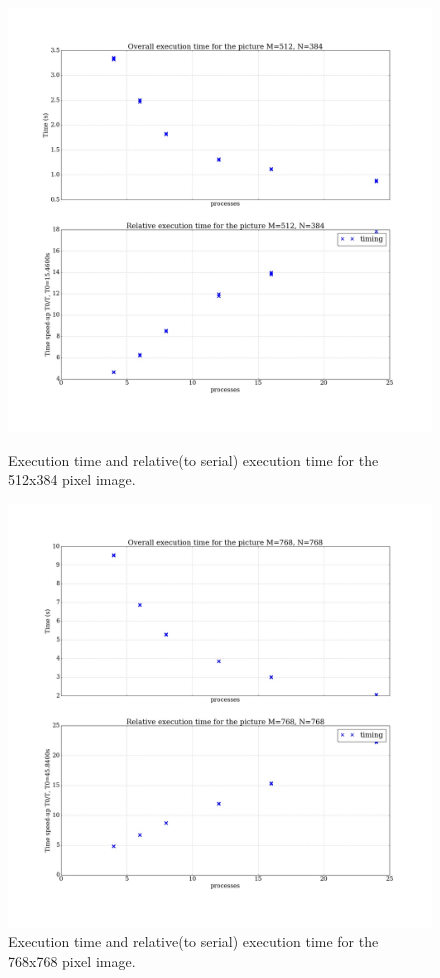 \documentclass[11pt]{article}
\begin{document}
	\begin{figure}[ht]	
		\centering
		\begin{minipage}[b]{.5\textwidth}
			\centering
			\includegraphics[width=\linewidth]{exec_512x384.jpeg}
			\caption{Execution time and relative(to serial) execution time for the 512x384 pixel image.}\label{exec_3}
		\end{minipage}%
		\begin{minipage}[b]{.5\textwidth}
			\centering
			\includegraphics[width=\linewidth]{exec_768x768.jpeg}
			\caption{Execution time and relative(to serial) execution time for the 768x768 pixel image.}\label{exec_4}
		\end{minipage}
	\end{figure}
\end{document}

